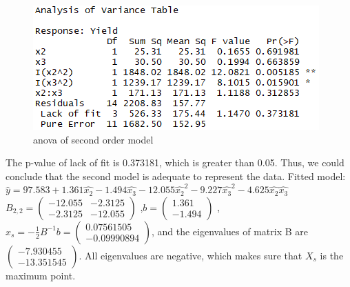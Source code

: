 \documentclass[11pt]{article}
\begin{document}
\begin{figure}[h!]
  
  \center
  \includegraphics[scale = .45]{pictures/anova_growth2.png}
  \caption{anova of second order model}
  \label{fig:anova_growth}
\end{figure}

The p-value of lack of fit is 0.373181, which is greater than 0.05. Thus, we could conclude that the second model is adequate to represent the data.
Fitted model:
$\hat{y} = 97.583 + 1.361\hat{x_2} - 1.494\hat{x_3} - 12.055\hat{x_2}^2 - 9.227\hat{x_3}^2- 4.625\hat{x_2}\hat{x_3} $
\\
$B_{2,2} = 
 \begin{pmatrix}
  -12.055 & -2.3125 \\
  -2.3125 &-12.055 
 \end{pmatrix}$
,$b =
\begin{pmatrix}
  1.361\\
  -1.494 
 \end{pmatrix}$
,$x_s = -\frac{1}{2}B^{-1}b = \begin{pmatrix}
   0.07561505\\
 -0.09990894
 \end{pmatrix} $, and the eigenvalues of matrix B are $\begin{pmatrix}
  -7.930455\\
  -13.351545
 \end{pmatrix} $. All eigenvalues are negative, which makes sure that $X_s$ is the maximum point.
\end{document}
